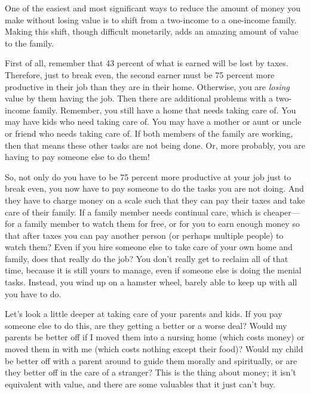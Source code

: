 \begin{infonote}
One of the easiest and most significant ways to reduce the amount of
money you make without losing value is to shift from a two-income to a
one-income family. Making this shift, though difficult monetarily, adds
an amazing amount of value to the family.

First of all, remember that 43 percent of what is earned will be lost by
taxes. Therefore, just to break even, the second earner must be 75
percent more productive in their job than they are in their home.
Otherwise, you are \textit{losing} value by them having the job.
Then there are additional problems with a two-income family. 
Remember, you still have a home that needs taking
care of. You may have kids who need taking care of. You may have a
mother or aunt or uncle or friend who needs taking care of. If both
members of the family are working, then that means these other tasks
are not being done. Or, more probably, you are having to pay someone
else to do them!

So, not only do you have to be 75 percent more productive at your job
just to break even, you now have to pay someone to do the tasks you are
not doing. And they have to charge money on a scale such that they can
pay their taxes and take care of their family. If a family member needs
continual care, which is cheaper---for a family member to watch them for
free, or for you to earn enough money so that after taxes you can pay
another person (or perhaps multiple people) to watch them?  Even if you
hire someone else to take care of your own home and family, does that
really do the job?  You don’t really get to reclaim all of that time,
because it is still yours to manage, even if someone else is doing 
the menial tasks. Instead, you wind up on a hamster
wheel, barely able to keep up with all you have to do.

Let's look a little deeper at taking care of your parents and kids. 
If you pay someone else to do this, are they
getting a better or a worse deal?  Would my parents be better off if I
moved them into a nursing home (which costs money) or moved them in
with me (which costs nothing except their food)?  Would my child be
better off with a parent around to guide them morally and spiritually,
or are they better off in the care of a stranger?  This is the thing
about money; it isn’t equivalent with value, and there are some
valuables that it just can’t buy.


\end{infonote}
